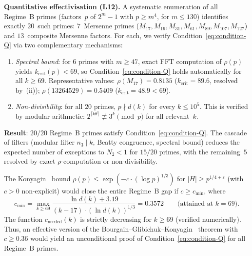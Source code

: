 \documentclass[12pt, a4paper]{amsart}
\theoremstyle{plain}
\theoremstyle{definition}
\theoremstyle{remark}
\begin{document}
\medskip\noindent
\textbf{Quantitative effectivisation (L12).}
A systematic enumeration of all Regime~B primes
(factors~$p$ of $2^m - 1$ with $p \geq m^4$, for
$m \leq 130$) identifies exactly $20$~such primes:
$7$~Mersenne primes ($M_{17}, M_{19}, M_{31}, M_{61},
M_{89}, M_{107}, M_{127}$) and $13$~composite Mersenne
factors.
For each, we verify Condition~\eqref{eq:condition-Q}
via two complementary mechanisms:
\begin{enumerate}[label=(\roman*)]
  \item \emph{Spectral bound}: for $6$ primes with
    $m \geq 47$, exact FFT computation of $\rho(p)$
    yields $k_{\mathrm{crit}}(p) < 69$, so
    Condition~\eqref{eq:condition-Q} holds automatically
    for all $k \geq 69$.
    Representative values: $\rho(M_{17}) = 0.8135$
    ($k_{\mathrm{crit}} = 89.6$, resolved by~(ii));
    $\rho(13264529) = 0.5409$ ($k_{\mathrm{crit}} = 48.9 < 69$).
  \item \emph{Non-divisibility}: for all $20$ primes,
    $p \nmid d(k)$ for every $k \leq 10^5$.
    This is verified by modular arithmetic:
    $2^{\lceil k\theta \rceil} \not\equiv 3^k \pmod{p}$
    for all relevant~$k$.
\end{enumerate}
\textbf{Result}: $20/20$ Regime~B primes satisfy
Condition~\eqref{eq:condition-Q}.
The cascade of filters (modular filter $n_3 \mid k$,
Beatty congruence, spectral bound) reduces the expected
number of exceptions to $N_2 < 1$ for $15/20$ primes,
with the remaining~$5$ resolved by exact $\rho$-computation
or non-divisibility.

The Konyagin~\cite{Konyagin2003} bound
$\rho(p) \leq \exp(-c \cdot (\log p)^{1/3})$ for
$|H| \geq p^{1/4+\varepsilon}$ (with $c > 0$
non-explicit) would close the entire Regime~B gap if
$c \geq c_{\min}$, where
\begin{equation}\label{eq:c-min}
  c_{\min} = \max_{k \geq 69}
    \frac{\ln d(k) + 3.19}{(k - 17) \cdot (\ln d(k))^{1/3}}
  = 0.3572
  \qquad\text{(attained at } k = 69\text{).}
\end{equation}
The function $c_{\mathrm{needed}}(k)$ is strictly decreasing
for $k \geq 69$ (verified numerically).
Thus, an effective version of the
Bourgain--Glibichuk--Konyagin~\cite{BGK2006} theorem with
$c \geq 0.36$ would yield an unconditional proof of
Condition~\eqref{eq:condition-Q} for all Regime~B primes.
\end{document}
